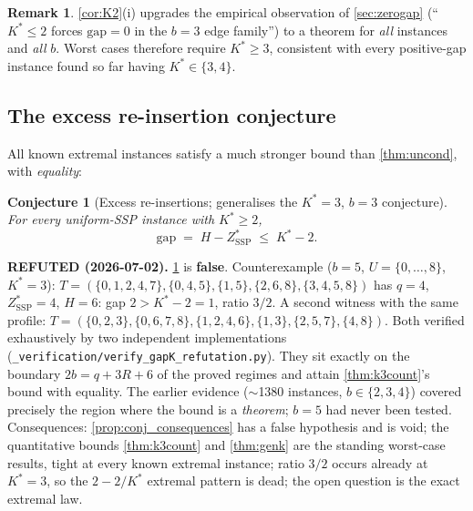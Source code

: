 \documentclass[11pt,a4paper]{article}
\theoremstyle{plain}
\newtheorem{conjecture}[theorem]{Conjecture}
\theoremstyle{definition}
\newtheorem{remark}[theorem]{Remark}
\newcommand{\Kstar}{K^{*}}
\newcommand{\ZSSP}{Z_{\mathrm{SSP}}^{*}}
\begin{document}
\begin{remark}
\cref{cor:K2}(i) upgrades the empirical observation of \cref{sec:zerogap} (``$\Kstar\le2$
forces $\mathrm{gap}=0$ in the $b=3$ edge family'') to a theorem for \emph{all} instances
and \emph{all} $b$. Worst cases therefore require $\Kstar\ge3$, consistent with every
positive-gap instance found so far having $\Kstar\in\{3,4\}$.
\end{remark}

\subsection{The excess re-insertion conjecture}

All known extremal instances satisfy a much stronger bound than \cref{thm:uncond}, with
\emph{equality}:

\begin{thmbox}
\begin{conjecture}[Excess re-insertions; generalises the $\Kstar{=}3$, $b{=}3$ conjecture]
\label{conj:gapK}
For every uniform-SSP instance with $\Kstar\ge2$,
\[
  \mathrm{gap}\;=\;H-\ZSSP\;\le\;\Kstar-2 .
\]
\end{conjecture}
\end{thmbox}

\begin{warnbox}
\textbf{REFUTED (2026-07-02).} \cref{conj:gapK} is \textbf{false}.
Counterexample ($b=5$, $U=\{0,\dots,8\}$, $\Kstar=3$):
$T=(\{0,1,2,4,7\},\{0,4,5\},\{1,5\},\{2,6,8\},\{3,4,5,8\})$ has $q=4$,
$\ZSSP=4$, $H=6$: gap $2>\Kstar-2=1$, ratio $3/2$. A second witness with the
same profile: $T=(\{0,2,3\},\{0,6,7,8\},\{1,2,4,6\},\{1,3\},\{2,5,7\},
\{4,8\})$. Both verified exhaustively by two independent implementations
(\texttt{\_verification/verify\_gapK\_refutation.py}). They sit exactly on the
boundary $2b=q+3R+6$ of the proved regimes and attain \cref{thm:k3count}'s
bound with equality. The earlier evidence ($\sim$1380 instances,
$b\in\{2,3,4\}$) covered precisely the region where the bound is a
\emph{theorem}; $b=5$ had never been tested. Consequences:
\cref{prop:conj_consequences} has a false hypothesis and is void; the
quantitative bounds \cref{thm:k3count} and \cref{thm:genk} are the standing
worst-case results, tight at every known extremal instance; ratio $3/2$
occurs already at $\Kstar=3$, so the $2-2/\Kstar$ extremal pattern is dead;
the open question is the exact extremal law.
\end{warnbox}
\end{document}
